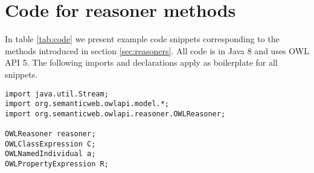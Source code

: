 \documentclass[paper.tex]{subfiles}
\begin{document}
\section{Code for reasoner methods}
\label{app:code}

In table \ref{tab:code} we present example code snippets corresponding to the methods introduced in section \ref{sec:reasoners}.  All code is in Java 8 and uses OWL API 5.  The following imports and declarations apply as boilerplate for all snippets.

\bigskip

\noindent
\begin{verbatim}
import java.util.Stream;
import org.semanticweb.owlapi.model.*;
import org.semanticweb.owlapi.reasoner.OWLReasoner;

OWLReasoner reasoner;
OWLClassExpression C;
OWLNamedIndividual a;
OWLPropertyExpression R;
\end{verbatim}
\end{document}

